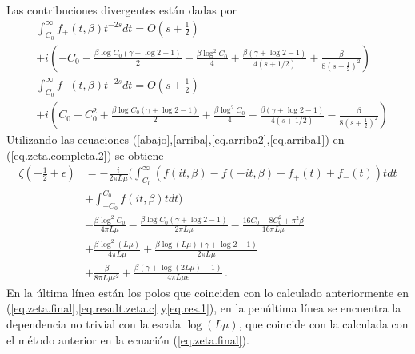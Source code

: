 Las contribuciones divergentes están dadas por
\begin{align}
\label{arriba}
&
	\int _{C _0} ^{\infty}
			f _{+} (t, \beta )			
			 t ^{-2s} dt =  
	O \left( s + \frac{1}{2} \right)
\\[5pt]
\nonumber			
&+
	i \left(- C _0 
		    - \frac{\beta \log C_0 (\gamma + \log 2 - 1 ) 
		    		}{2} 
		    - \frac{\beta \log ^2 C _0}{4}
		    + \frac{\beta ( \gamma + \log 2 -1 )}{4 (s + 1/2)} 
		    + \frac{\beta}{8 (s + \frac{1}{2}) ^2}
					\right)
\\[5pt]
\label{abajo}
&
	\int _{C _0} ^{\infty}
			f _{-} ( t, \beta)
			 t ^{-2s} dt =
	O \left(s + \frac{1}{2} \right)
\\[5pt]
\nonumber
&+
	i \left(C _0 
			- C _0 ^2
		    + \frac{\beta \log C_0 (\gamma + \log 2 - 1 ) 
		    		}{2} 
		    + \frac{\beta \log ^2 C _0}{4}
		    - \frac{\beta ( \gamma + \log 2 -1 )}{4 (s + 1/2)} 
		    - \frac{\beta}{8 (s + \frac{1}{2}) ^2}
					\right)
\end{align}
Utilizando las ecuaciones (\ref{abajo},\ref{arriba},\ref{eq.arriba2},\ref{eq.arriba1}) en (\ref{eq.zeta.completa.2}) se obtiene
\begin{align}
\zeta \left( - \frac{1}{2}  + \epsilon \right) &=
- \frac{i}{2 \pi L \mu} 
\Bigg(	  
		 \int _{C _0} ^{\infty}
			\left(
					f (i t,\beta )
					- f (-i t,\beta )
					- f _{+} (t) 
					+ f _{-} (t)
					\right)
			t   dt   \nonumber
\\ \nonumber
&+
		 \int _{- C _0} ^{C _0}
			f (i t,\beta )
			t   dt 	
	\Bigg)
\\ \nonumber
&
	- \frac{\beta \log ^2 C _0}{4 \pi L \mu}
	- \frac{\beta \log C _0 (\gamma + \log 2 -1 )}{2 \pi L \mu} 
	- \frac{16 C_0 - 8 C _0 ^2 + \pi ^2 \beta}{16 \pi L \mu}
\\ \nonumber
&
	+\frac{\beta \log ^2 (L \mu )}{4 \pi L \mu} 
	+ \frac{\beta \log  (L \mu) (\gamma + \log 2 -1)}{2 \pi L \mu}
\\ 
&	+ \frac{\beta}
		 {8 \pi L \mu  \epsilon ^2} +
	\frac{\beta (\gamma + \log (2 L \mu) -1 ) }
		 {4 \pi L \mu  \epsilon } 
\, .
\end{align}
En la última línea están los polos que coinciden con lo calculado anteriormente en (\ref{eq.zeta.final},\ref{eq.result.zeta.c} y\ref{eq.res.1}), en la penúltima línea se encuentra la dependencia no trivial con la escala $\log (L \mu)$, que coincide con la calculada con el método anterior en la ecuación (\ref{eq.zeta.final}).


